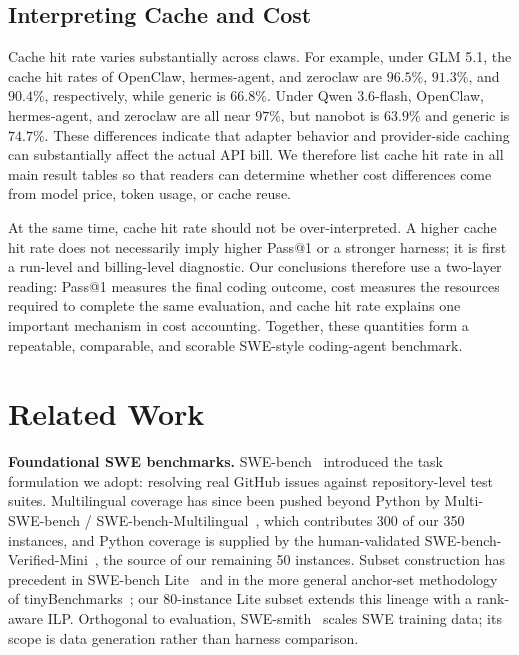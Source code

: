 \documentclass{llmxive}
\begin{document}
\subsection{Interpreting Cache and Cost}\label{sec:cost_perf}

Cache hit rate varies substantially across claws. For example, under GLM 5.1, the cache hit rates of OpenClaw, hermes-agent, and zeroclaw are $96.5\%$, $91.3\%$, and $90.4\%$, respectively, while generic is $66.8\%$. Under Qwen 3.6-flash, OpenClaw, hermes-agent, and zeroclaw are all near $97\%$, but nanobot is $63.9\%$ and generic is $74.7\%$. These differences indicate that adapter behavior and provider-side caching can substantially affect the actual API bill. We therefore list cache hit rate in all main result tables so that readers can determine whether cost differences come from model price, token usage, or cache reuse.

At the same time, cache hit rate should not be over-interpreted. A higher cache hit rate does not necessarily imply higher Pass@1 or a stronger harness; it is first a run-level and billing-level diagnostic. Our conclusions therefore use a two-layer reading: Pass@1 measures the final coding outcome, cost measures the resources required to complete the same evaluation, and cache hit rate explains one important mechanism in cost accounting. Together, these quantities form a repeatable, comparable, and scorable SWE-style coding-agent benchmark.

\section{Related Work}\label{sec:related}



\textbf{Foundational SWE benchmarks.}
SWE-bench~\cite{jimenez_swebench_2024} introduced the task formulation we adopt: resolving real GitHub issues against repository-level test suites. Multilingual coverage has since been pushed beyond Python by Multi-SWE-bench / SWE-bench-Multilingual~\cite{swe_smith}, which contributes 300 of our 350 instances, and Python coverage is supplied by the human-validated SWE-bench-Verified-Mini~\cite{swebench_verified_mini}, the source of our remaining 50 instances. Subset construction has precedent in SWE-bench Lite~\cite{swebench_lite} and in the more general anchor-set methodology of tinyBenchmarks~\cite{tinybenchmarks}; our 80-instance Lite subset extends this lineage with a rank-aware ILP. Orthogonal to evaluation, SWE-smith~\cite{swe_smith} scales SWE training data; its scope is data generation rather than harness comparison.
\end{document}
